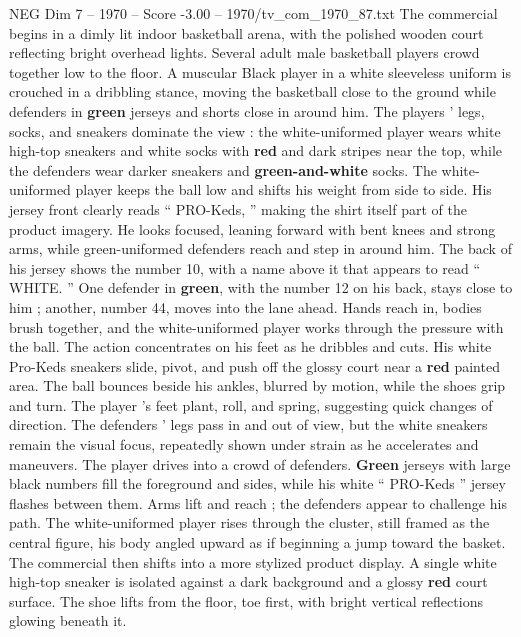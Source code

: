 \begin{textsample}{NEG Dim 7 – 1970 – Score -3.00 – 1970/tv\_com\_1970\_87.txt}  \label{ex:f7_neg_063}
The commercial begins in a dimly lit indoor basketball arena, with the polished wooden court reflecting bright overhead lights.
Several adult male basketball players crowd together low to the floor.
A muscular Black player in a white sleeveless uniform is crouched in a dribbling stance, moving the basketball close to the ground while defenders in \textbf{green} jerseys and shorts close in around him.
The players ’ legs, socks, and sneakers dominate the view : the white-uniformed player wears white high-top sneakers and white socks with \textbf{red} and dark stripes near the top, while the defenders wear darker sneakers and \textbf{green-and-white} socks.
The white-uniformed player keeps the ball low and shifts his weight from side to side.
His jersey front clearly reads “ PRO-Keds, ” making the shirt itself part of the product imagery.
He looks focused, leaning forward with bent knees and strong arms, while green-uniformed defenders reach and step in around him.
The back of his jersey shows the number 10, with a name above it that appears to read “ WHITE. ” One defender in \textbf{green}, with the number 12 on his back, stays close to him ; another, number 44, moves into the lane ahead.
Hands reach in, bodies brush together, and the white-uniformed player works through the pressure with the ball.
The action concentrates on his feet as he dribbles and cuts.
His white Pro-Keds sneakers slide, pivot, and push off the glossy court near a \textbf{red} painted area.
The ball bounces beside his ankles, blurred by motion, while the shoes grip and turn.
The player ’s feet plant, roll, and spring, suggesting quick changes of direction.
The defenders ’ legs pass in and out of view, but the white sneakers remain the visual focus, repeatedly shown under strain as he accelerates and maneuvers.
The player drives into a crowd of defenders. \textbf{Green} jerseys with large black numbers fill the foreground and sides, while his white “ PRO-Keds ” jersey flashes between them.
Arms lift and reach ; the defenders appear to challenge his path.
The white-uniformed player rises through the cluster, still framed as the central figure, his body angled upward as if beginning a jump toward the basket.
The commercial then shifts into a more stylized product display.
A single white high-top sneaker is isolated against a dark background and a glossy \textbf{red} court surface.
The shoe lifts from the floor, toe first, with bright vertical reflections glowing beneath it.

\end{textsample}
